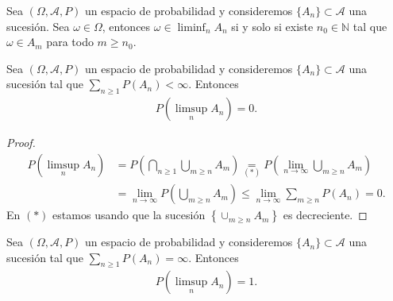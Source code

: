 \begin{teo}
    Sea $(\Omega,\mathcal{A},P)$ un espacio de probabilidad y consideremos $\{A_n\} \subset \mathcal{A}$ una sucesión. Sea $\omega \in \Omega$, entonces $\omega \in \liminf_n A_n$ si y solo si existe $n_0 \in \mathbb{N}$ tal que $\omega \in A_m$ para todo $m \ge n_0$.
\end{teo}

\begin{teo}
    Sea $(\Omega,\mathcal{A},P)$ un espacio de probabilidad y consideremos $\{A_n\} \subset \mathcal{A}$ una sucesión tal que $\sum_{n \ge 1} P(A_n) < \infty$. Entonces
    \begin{align*}
        P\left( \limsup_n A_n \right) = 0.
    \end{align*}
\end{teo}

\begin{proof}
    \begin{align*}
        P\left( \limsup_n A_n \right) &= P \left( \bigcap_{n \ge 1} \bigcup_{m \ge n} A_m \right) \underset{(*)}{=} P \left( \lim_{n \to \infty} \bigcup_{m \ge n} A_m \right) \\
        &= \lim_{n \to \infty} P \left( \bigcup_{m \ge n} A_m \right) \leq \lim_{n \to \infty} \sum_{m \ge n} P(A_n) = 0.
    \end{align*}
    En $(*)$ estamos usando que la sucesión $\left\{ \cup_{m \ge n} A_m \right\}$ es decreciente.
\end{proof}

\begin{teo}
     Sea $(\Omega,\mathcal{A},P)$ un espacio de probabilidad y consideremos $\{A_n\} \subset \mathcal{A}$ una sucesión tal que $\sum_{n \ge 1} P(A_n) = \infty$. Entonces
    \begin{align*}
        P\left( \limsup_n A_n \right) = 1.
    \end{align*}
\end{teo}

